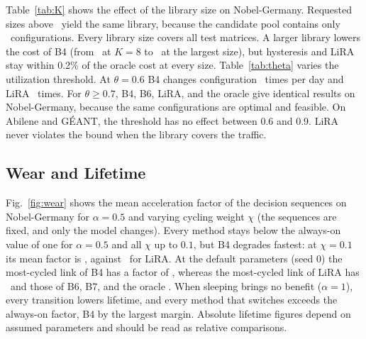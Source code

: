 \documentclass[journal]{IEEEtran}
\begin{document}
\begin{table}[t]
\centering
\caption{Ablation of LiRA on Nobel-Germany at the Default Price (Mean over Seeds 0 to 2)}
\label{tab:ablation}
\scriptsize
\setlength{\tabcolsep}{2pt}

\end{table}

Table~\ref{tab:K} shows the effect of the library size on Nobel-Germany. Requested sizes above \KactualMax\ yield the same library, because the candidate pool contains only \nobCand\ configurations. Every library size covers all test matrices. A larger library lowers the cost of B4 (from \KBFouratEight\ at $K=8$ to \KBFouratSixFour\ at the largest size), but hysteresis and LiRA stay within 0.2\% of the oracle cost at every size. Table~\ref{tab:theta} varies the utilization threshold. At $\theta=0.6$ B4 changes configuration \thSixBFourchg\ times per day and LiRA \thSixLiRAchg\ times. For $\theta\ge0.7$, B4, B6, LiRA, and the oracle give identical results on Nobel-Germany, because the same configurations are optimal and feasible. On Abilene and G\'{E}ANT, the threshold has no effect between 0.6 and 0.9. LiRA never violates the bound when the library covers the traffic.

\begin{table}[t]
\centering
\caption{Library Size on Nobel-Germany: Test Coverage and Total Cost $J$ of Each Method (Base Scenario, Seed 0)}
\label{tab:K}
\footnotesize
\setlength{\tabcolsep}{4pt}

\end{table}

\begin{table}[t]
\centering
\caption{Utilization Threshold $\theta$ (Base Scenario, Seed 0)}
\label{tab:theta}
\footnotesize
\setlength{\tabcolsep}{4pt}

\end{table}

\subsection{Wear and Lifetime}\label{sec:res-wear}

Fig.~\ref{fig:wear} shows the mean acceleration factor of the decision sequences on Nobel-Germany for $\alpha=0.5$ and varying cycling weight $\chi$ (the sequences are fixed, and only the model changes). Every method stays below the always-on value of one for $\alpha=0.5$ and all $\chi$ up to $0.1$, but B4 degrades fastest: at $\chi=0.1$ its mean factor is \wearBigChiBFour, against \wearBigChiLiRA\ for LiRA. At the default parameters (seed 0) the most-cycled link of B4 has a factor of \maxAFfour, whereas the most-cycled link of LiRA has \maxAFlira\ and those of B6, B7, and the oracle \maxAFothers. When sleeping brings no benefit ($\alpha=1$), every transition lowers lifetime, and every method that switches exceeds the always-on factor, B4 by the largest margin. Absolute lifetime figures depend on assumed parameters and should be read as relative comparisons.
\end{document}
